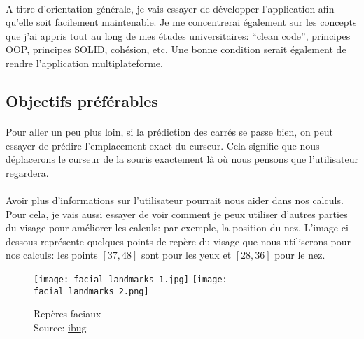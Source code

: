 \paragraph{}
A titre d'orientation générale, je vais essayer de développer l'application afin qu'elle soit facilement maintenable.
Je me concentrerai également sur les concepts que j'ai appris tout au long de mes études universitaires: ``clean code'', principes OOP, principes SOLID, cohésion, etc.
Une bonne condition serait également de rendre l'application multiplateforme.

\subsection{Objectifs préférables}
\paragraph{}
Pour aller un peu plus loin, si la prédiction des carrés se passe bien, on peut essayer de prédire l'emplacement exact du curseur.
Cela signifie que nous déplacerons le curseur de la souris exactement là où nous pensons que l'utilisateur regardera.

\paragraph{}
Avoir plus d'informations sur l'utilisateur pourrait nous aider dans nos calculs.
Pour cela, je vais aussi essayer de voir comment je peux utiliser d'autres parties du visage pour améliorer les calculs: par exemple, la position du nez.
L'image ci-dessous représente quelques points de repère du visage que nous utiliserons pour nos calculs: les points $[37, 48]$ sont pour les yeux et $[28, 36]$ pour le nez.
\begin{figure}[H]
    \centering
    \texttt{[image: facial\_landmarks\_1.jpg]}
    \texttt{[image: facial\_landmarks\_2.png]}
    \caption{Repères faciaux\\Source: \href{https://ibug.doc.ic.ac.uk/resources/300-W/}{ibug}}
    \label{figure:facial-landmarks}
\end{figure}